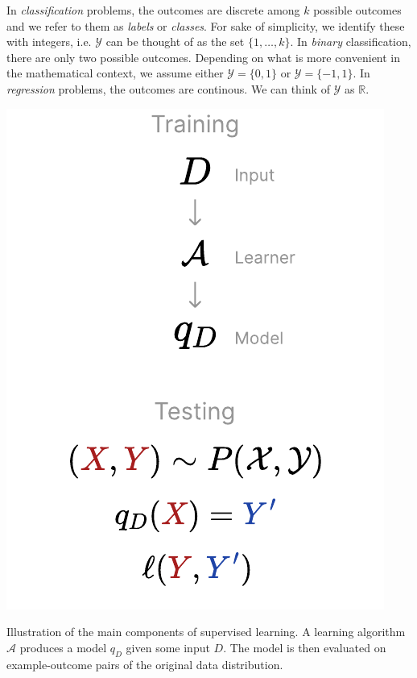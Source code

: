 \documentclass[
    a4paper, %
	fontsize=10pt, %
	twoside=false, %
]{kaobook}
\begin{document}
\begin{titlepage}
In \textit{classification} problems, the outcomes are discrete among $k$ possible outcomes and we refer to them as \textit{labels} or \textit{classes}. For sake of simplicity, we identify these with integers, i.e. $\mathcal{Y}$ can be thought of as the set $\{ 1, \dots, k \}$. In \textit{binary} classification, there are only two possible outcomes. Depending on what is more convenient in the mathematical context, we assume either $\mathcal{Y} = \{0,1\}$ or $\mathcal{Y} = \{-1, 1\}$.
In \textit{regression} problems, the outcomes are continous. We can think of $\mathcal{Y}$ as $\mathbb{R}$.

\begin{marginfigure}
	\includegraphics[width=\textwidth]{figma-illustrations/supervised-learning}
	\label{fig:supervised-learning}
	\caption{Illustration of the main components of supervised learning. A learning algorithm $\mathcal{A}$ produces a model $q_D$ given some input $D$. The model is then evaluated on example-outcome pairs of the original data distribution.}
\end{marginfigure}


\end{titlepage}
\end{document}
